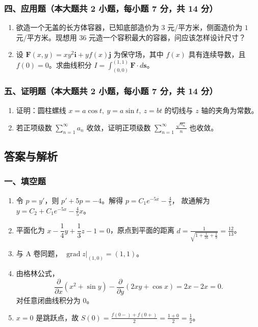 \subsubsection*{四、应用题（本大题共 2 小题，每小题 7 分，共 14 分）}
\begin{enumerate}
  \item 欲造一个无盖的长方体容器，已知底部造价为 $3$ 元/平方米，侧面造价为 $1$ 元/平方米。现想用 36 元造一个容积最大的容器，问应该怎样设计尺寸？
  \item 设 $\mathbf F(x,y)=xy^2\mathbf i+yf(x)\mathbf j$ 为保守场，其中 $f(x)$ 具有连续导数，且 $f(0)=0$。求曲线积分
  \(\displaystyle I=\int_{(0,0)}^{(1,1)}\mathbf F\cdot d\mathbf s\)。
\end{enumerate}

\subsubsection*{五、证明题（本大题共 2 小题，每小题 7 分，共 14 分）}
\begin{enumerate}
  \item 证明：圆柱螺线 $x=a\cos t,\ y=a\sin t,\ z=bt$ 的切线与 $z$ 轴的夹角为常数。
  \item 若正项级数 $\displaystyle\sum_{n=1}^{\infty}a_n$ 收敛，证明正项级数 \(\displaystyle \sum_{n=1}^{\infty}\frac{\sqrt{a_n}}{n}\)
  也收敛。
\end{enumerate}

\subsection{答案与解析}

\subsubsection*{一、填空题}
\begin{enumerate}
  \item 令 $p=y'$，则 $p'+5p=-4$。解得
  \(\displaystyle p=C_1e^{-5x}-\frac45\)，
  故通解为
  \(\displaystyle y=C_2+C_1e^{-5x}-\frac45x\)。
  \item 平面化为 $x-\dfrac14y+\dfrac13z-1=0$，原点到平面的距离
  \(\displaystyle d=\frac1{\sqrt{1+\frac1{16}+\frac1{9}}}=\frac{12}{13}\)。
  \item 与 A 卷同题，
  \(\displaystyle \operatorname{grad}z\big|_{(1,0)}=(1,1)\)。
  \item 由格林公式，
  \[
  \frac{\partial}{\partial x}(x^2+\sin y)-\frac{\partial}{\partial y}(2xy+\cos x)=2x-2x=0.
  \]
  对任意闭曲线积分为 $0$。
  \item $x=0$ 是跳跃点，故
  \(\displaystyle S(0)=\frac{f(0-)+f(0+)}2=\frac{1+0}{2}=\frac12\)。
\end{enumerate}

